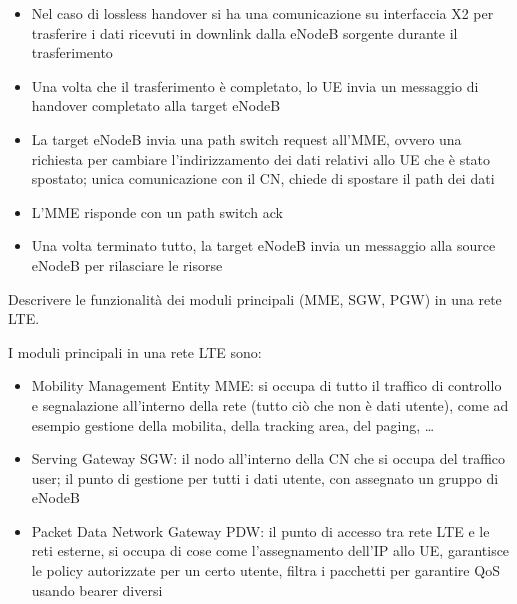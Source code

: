 \begin{questions}
\begin{solution}
\begin{itemize}
            \item Nel caso di lossless handover si ha una comunicazione su interfaccia X2 per trasferire i dati ricevuti in downlink dalla eNodeB sorgente durante il trasferimento
            
            \item Una volta che il trasferimento è completato, lo UE invia un messaggio di handover completato alla target eNodeB
            
            \item La target eNodeB invia una path switch request all'MME, ovvero una richiesta per cambiare l'indirizzamento dei dati relativi allo UE che è stato spostato; unica comunicazione con il CN, chiede di spostare il path dei dati
            
            \item L'MME risponde con un path switch ack
            
            \item Una volta terminato tutto, la target eNodeB invia un messaggio alla source eNodeB per rilasciare le risorse
        \end{itemize}
    \end{solution}
    
    \question Descrivere le funzionalità dei moduli principali (MME, SGW, PGW) in una rete LTE.
    
    \begin{solution}
        I moduli principali in una rete LTE sono: 
        \begin{itemize}
            \item Mobility Management Entity MME: si occupa di tutto il traffico di controllo e segnalazione all'interno della rete (tutto ciò che non è dati utente), come ad esempio gestione della mobilita, della tracking area, del paging, \dots
            
            \item Serving Gateway SGW: il nodo all'interno della CN che si occupa del traffico user; il punto di gestione per tutti i dati utente, con assegnato un gruppo di eNodeB
            
            \item Packet Data Network Gateway PDW: il punto di accesso tra rete LTE e le reti esterne, si occupa di cose come l'assegnamento dell'IP allo UE, garantisce le policy autorizzate per un certo utente, filtra i pacchetti per garantire QoS usando bearer diversi
        \end{itemize}
    \end{solution}
\end{questions}